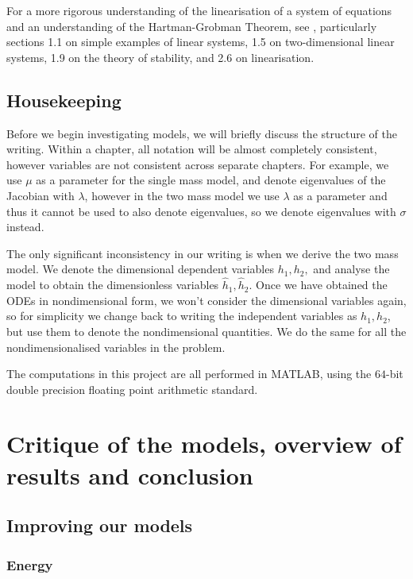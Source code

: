 \documentclass{report}
\begin{document}
For a more rigorous understanding of the linearisation of a system of equations and an understanding of the Hartman-Grobman Theorem,
see \cite{perko_textbook_1996},
particularly sections 1.1 on simple examples of linear systems,
1.5 on two-dimensional linear systems,
1.9 on the theory of stability,
and 2.6 on linearisation.

\section{Housekeeping}

Before we begin investigating models, we will briefly discuss the structure of the writing.
Within a chapter, all notation will be almost completely consistent,
however variables are not consistent across separate chapters.
For example, we use $\mu$ as a parameter for the single mass model,
and denote eigenvalues of the Jacobian with $\lambda$,
however in the two mass model we use $\lambda$ as a parameter and thus it cannot be used to also denote eigenvalues,
so we denote eigenvalues with $\sigma$ instead.

The only significant inconsistency in our writing is when we derive the two mass model.
We denote the dimensional dependent variables $h_1,h_2,$
and analyse the model to obtain the dimensionless variables $\hat{h}_1,\hat{h}_2.$
Once we have obtained the ODEs in nondimensional form,
we won't consider the dimensional variables again,
so for simplicity we change back to writing the independent variables as $h_1,h_2$,
but use them to denote the nondimensional quantities.
We do the same for all the nondimensionalised variables in the problem.

The computations in this project are all performed in MATLAB,
using the $64$-bit double precision floating point arithmetic standard.





\chapter{Critique of the models, overview of results and conclusion}

\section{Improving our models}

\subsection{Energy}
\end{document}
